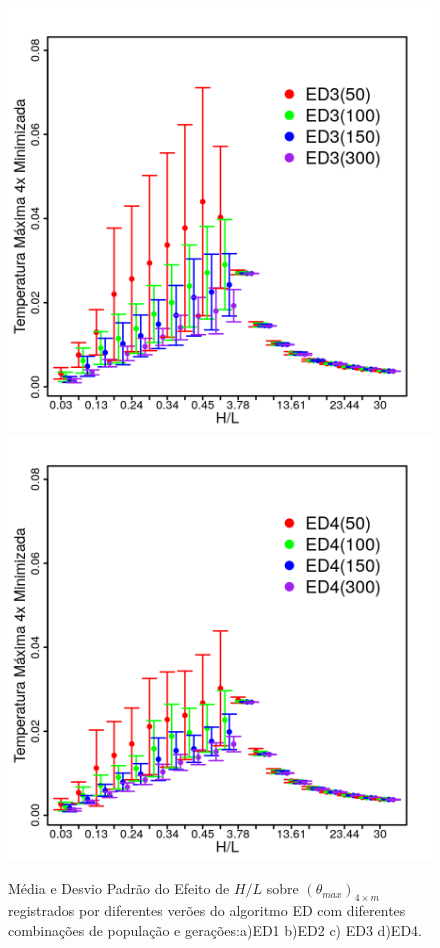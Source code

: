\documentclass[12pt,A4,A4pt]{article}
\begin{document}
\begin{figure}[htbp]
\quad
\includegraphics[scale=.91]{imgs/plot_de3_rdata_std.png}
\quad
\includegraphics[scale=.91]{imgs/plot_de4_rdata_std.png}

\caption{\fontsize{10pt}{\baselineskip}\selectfont Média e Desvio Padrão do Efeito de $H/L$ sobre $({\theta}_{max})_{4\times m}$ registrados por diferentes verões do algoritmo ED com diferentes combinações de população e gerações:a)ED1 b)ED2 c) ED3 d)ED4.}
\label{destdinner}
\end{figure}
\end{document}
